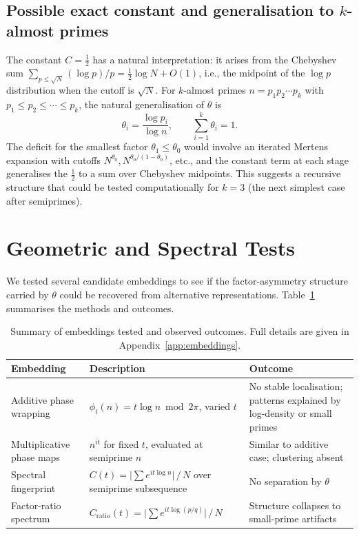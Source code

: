 \documentclass[11pt]{article}
\theoremstyle{definition}
\begin{document}
\subsection{Possible exact constant and generalisation to \texorpdfstring{$k$}{k}-almost primes}
\label{sec:generalisation}

The constant \(C = \tfrac12\) has a natural interpretation: it arises from the
Chebyshev sum \(\sum_{p\le\sqrt N} (\log p)/p = \tfrac12\log N + O(1)\), i.e., the
midpoint of the \(\log p\) distribution when the cutoff is \(\sqrt N\).  For
\(k\)-almost primes \(n = p_1p_2\cdots p_k\) with \(p_1\le p_2\le\cdots\le p_k\), the
natural generalisation of \(\theta\) is
\[
\theta_i = \frac{\log p_i}{\log n},\qquad \sum_{i=1}^k\theta_i = 1.
\]
The deficit for the smallest factor \(\theta_1\le\theta_0\) would involve an iterated
Mertens expansion with cutoffs \(N^{\theta_0}, N^{\theta_0/(1-\theta_0)}\), etc., and
the constant term at each stage generalises the \(\tfrac12\) to a sum over
Chebyshev midpoints.  This suggests a recursive structure that could be tested
computationally for \(k=3\) (the next simplest case after semiprimes).


\section{Geometric and Spectral Tests}

We tested several candidate embeddings to see if the factor-asymmetry structure
carried by \(\theta\) could be recovered from alternative representations.
Table~\ref{tab:embeddings} summarises the methods and outcomes.

\begin{table}[ht]
\centering
\caption{Summary of embeddings tested and observed outcomes.  Full details
  are given in Appendix~\ref{app:embeddings}.}
\label{tab:embeddings}
\begin{tabular}{p{3.5cm} p{5cm} p{3.5cm}}
\toprule
\textbf{Embedding} & \textbf{Description} & \textbf{Outcome} \\
\midrule
Additive phase wrapping & \(\phi_t(n) = t\log n \bmod 2\pi\), varied \(t\) & No stable localisation; patterns explained by log-density or small primes \\
Multiplicative phase maps & \(n^{it}\) for fixed \(t\), evaluated at semiprime \(n\) & Similar to additive case; clustering absent \\
Spectral fingerprint & \(C(t) = \bigl|\sum e^{it\log n}\bigr|\,/\,N\) over semiprime subsequence & No separation by \(\theta\) \\
Factor-ratio spectrum & \(C_{\mathrm{ratio}}(t) = \bigl|\sum e^{it\log(p/q)}\bigr|\,/\,N\) & Structure collapses to small-prime artifacts \\
\bottomrule
\end{tabular}
\end{table}
\end{document}
